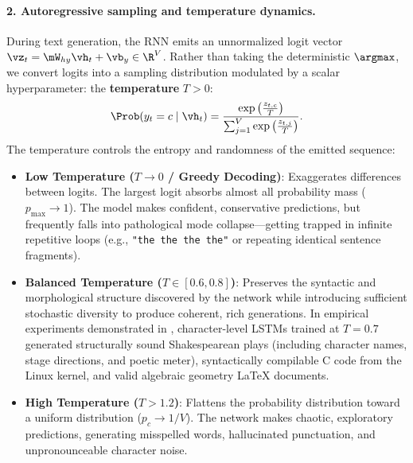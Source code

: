 \documentclass[../../main.tex]{subfiles}
\begin{document}
\paragraph{2. Autoregressive sampling and temperature dynamics.}
During text generation, the RNN emits an unnormalized logit vector $\vz_t = \mW_{hy} \vh_t + \vb_y \in \R^V$. Rather than taking the deterministic $\argmax$, we convert logits into a sampling distribution modulated by a scalar hyperparameter: the \textbf{temperature} $T > 0$:
\begin{equation}
\label{eq:temperature_sampling}
\Prob(y_t = c \mid \vh_t) = \frac{\exp\left( \frac{z_{t, c}}{T} \right)}{\sum_{j=1}^V \exp\left( \frac{z_{t, j}}{T} \right)}.
\end{equation}
The temperature controls the entropy and randomness of the emitted sequence:
\begin{itemize}
    \item \textbf{Low Temperature ($T \to 0$ / Greedy Decoding)}: Exaggerates differences between logits. The largest logit absorbs almost all probability mass ($p_{\max} \to 1$). The model makes confident, conservative predictions, but frequently falls into pathological mode collapse—getting trapped in infinite repetitive loops (e.g., \texttt{"the the the the"} or repeating identical sentence fragments).
    \item \textbf{Balanced Temperature ($T \in [0.6, 0.8]$)}: Preserves the syntactic and morphological structure discovered by the network while introducing sufficient stochastic diversity to produce coherent, rich generations. In empirical experiments demonstrated in \cite{karpathy2015rnn}, character-level LSTMs trained at $T=0.7$ generated structurally sound Shakespearean plays (including character names, stage directions, and poetic meter), syntactically compilable C code from the Linux kernel, and valid algebraic geometry LaTeX documents.
    \item \textbf{High Temperature ($T > 1.2$)}: Flattens the probability distribution toward a uniform distribution ($p_c \to 1/V$). The network makes chaotic, exploratory predictions, generating misspelled words, hallucinated punctuation, and unpronounceable character noise.
\end{itemize}
\end{document}
